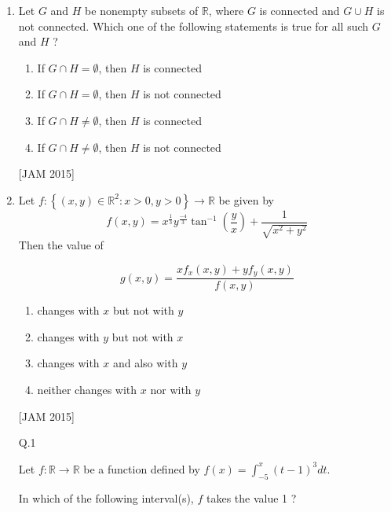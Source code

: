 \begin{enumerate}
\begin{enumerate}
\end{enumerate}
\hfill [JAM 2015]




\item  

Let $G$ and $H$ be nonempty subsets of $\mathbb{R}$, where $G$ is connected and $G \cup H$ is not connected. Which one of the following statements is true for all such $G$ and $H$ ? 
\begin{enumerate}
    \item If $G \cap H=\emptyset$, then $H$ is connected 
\item If $G \cap H=\emptyset$, then $H$ is not connected 
\item If $G \cap H \neq \emptyset$, then $H$ is connected 
\item If $G \cap H \neq \emptyset$, then $H$ is not connected
\end{enumerate}
\hfill [JAM 2015]





\item  

Let $f:\left\{(x, y) \in \mathbb{R}^{2}: x>0, y>0\right\} \rightarrow \mathbb{R}$ be given by
$$
f(x, y)=x^{\frac{1}{3}} y^{\frac{-4}{3}} \tan ^{-1}\left(\frac{y}{x}\right)+\frac{1}{\sqrt{x^{2}+y^{2}}}
$$
Then the value of

$$
g(x, y)=\frac{x f_{x}(x, y)+y f_{y}(x, y)}{f(x, y)}
$$

\begin{enumerate}
    \item changes with $x$ but not with $y$ 
\item changes with $y$ but not with $x$ 
\item changes with $x$ and also with $y$ 
\item neither changes with $x$ nor with $y$
\end{enumerate}
\hfill [JAM 2015]







Q.1

Let $f: \mathbb{R} \rightarrow \mathbb{R}$ be a function defined by $f(x)=\int_{-5}^{x}(t-1)^{3} d t$.

In which of the following interval(s), $f$ takes the value 1 ?\\

\begin{enumerate}
    

\end{enumerate}
\end{enumerate}
